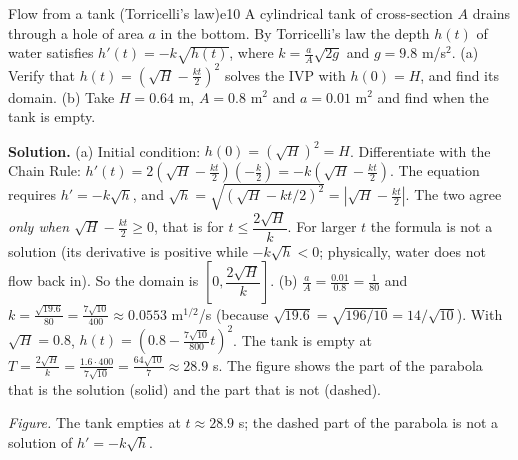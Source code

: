 \documentclass[11pt]{article}
\begin{document}
\begin{exmp}{Flow from a tank (Torricelli's law)}{e10}
A cylindrical tank of cross-section $A$ drains through a hole of area $a$ in the bottom. By Torricelli's law the depth $h(t)$ of water satisfies $h'(t)=-k\sqrt{h(t)}$, where $k=\frac aA\sqrt{2g}$ and $g=9.8$ m/s$^2$. (a) Verify that $h(t)=\left(\sqrt H-\frac{kt}2\right)^2$ solves the IVP with $h(0)=H$, and find its domain. (b) Take $H=0.64$ m, $A=0.8$ m$^2$ and $a=0.01$ m$^2$ and find when the tank is empty.

\textbf{Solution.} (a) Initial condition: $h(0)=(\sqrt H)^2=H$. Differentiate with the Chain Rule: $h'(t)=2\left(\sqrt H-\frac{kt}2\right)\left(-\frac k2\right)=-k\left(\sqrt H-\frac{kt}2\right)$. The equation requires $h'=-k\sqrt h$, and $\sqrt h=\sqrt{(\sqrt H-kt/2)^2}=\left|\sqrt H-\frac{kt}2\right|$. The two agree \emph{only when $\sqrt H-\frac{kt}2\ge0$}, that is for $t\le\dfrac{2\sqrt H}k$. For larger $t$ the formula is not a solution (its derivative is positive while $-k\sqrt h<0$; physically, water does not flow back in). So the domain is $\left[0,\dfrac{2\sqrt H}k\right]$.
(b) $\frac aA=\frac{0.01}{0.8}=\frac1{80}$ and $k=\frac{\sqrt{19.6}}{80}=\frac{7\sqrt{10}}{400}\approx0.0553$ m$^{1/2}$/s (because $\sqrt{19.6}=\sqrt{196/10}=14/\sqrt{10}$). With $\sqrt H=0.8$, $h(t)=\left(0.8-\frac{7\sqrt{10}}{800}t\right)^2$. The tank is empty at $T=\frac{2\sqrt H}k=\frac{1.6\cdot400}{7\sqrt{10}}=\frac{64\sqrt{10}}7\approx28.9$ s. The figure shows the part of the parabola that is the solution (solid) and the part that is not (dashed).

\begin{center}
\par\small\emph{Figure.} The tank empties at $t\approx28.9$ s; the dashed part of the parabola is not a solution of $h'=-k\sqrt h$.
\end{center}
\end{exmp}
\end{document}
